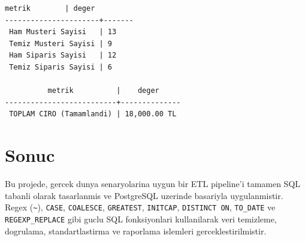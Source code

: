\documentclass[12pt,a4paper]{article}
\begin{document}
\begin{lstlisting}[caption=Rapor Ciktisi (Ozet)]
        metrik        | deger
----------------------+-------
 Ham Musteri Sayisi   | 13
 Temiz Musteri Sayisi | 9
 Ham Siparis Sayisi   | 12
 Temiz Siparis Sayisi | 6

          metrik          |    deger
--------------------------+--------------
 TOPLAM CIRO (Tamamlandi) | 18,000.00 TL
\end{lstlisting}

\section{Sonuc}
Bu projede, gercek dunya senaryolarina uygun bir ETL pipeline'i tamamen SQL tabanli olarak tasarlanmis ve PostgreSQL uzerinde basariyla uygulanmistir. Regex (\texttt{\~}), \texttt{CASE}, \texttt{COALESCE}, \texttt{GREATEST}, \texttt{INITCAP}, \texttt{DISTINCT ON}, \texttt{TO\_DATE} ve \texttt{REGEXP\_REPLACE} gibi guclu SQL fonksiyonlari kullanilarak veri temizleme, dogrulama, standartlastirma ve raporlama islemleri gerceklestirilmistir.
\end{document}
